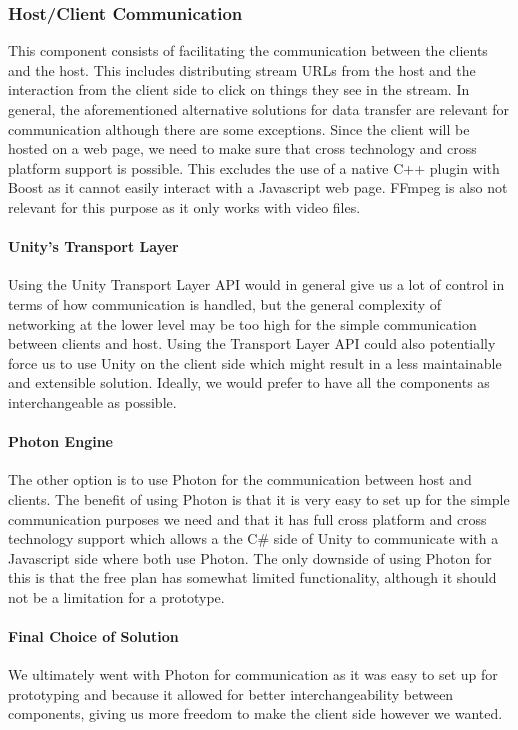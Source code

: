 \subsubsection{Host/Client Communication} %
This component consists of facilitating the communication between the clients and the host. This includes distributing stream URLs from the host and the interaction from the client side to click on things they see in the stream. In general, the aforementioned alternative solutions for data transfer are relevant for communication although there are some exceptions. Since the client will be hosted on a web page, we need to make sure that cross technology and cross platform support is possible. This excludes the use of a native C++ plugin with Boost as it cannot easily interact with a Javascript web page. FFmpeg is also not relevant for this purpose as it only works with video files.  
    
\paragraph{Unity's Transport Layer}
Using the Unity Transport Layer API would in general give us a lot of control in terms of how communication is handled, but the general complexity of networking at the lower level may be too high for the simple communication between clients and host. Using the Transport Layer API could also potentially force us to use Unity on the client side which might result in a less maintainable and extensible solution. Ideally, we would prefer to have all the components as interchangeable as possible. 
      
\paragraph{Photon Engine}
The other option is to use Photon for the communication between host and clients. The benefit of using Photon is that it is very easy to set up for the simple communication purposes we need and that it has full cross platform and cross technology support which allows a the C\# side of Unity to communicate with a Javascript side where both use Photon. The only downside of using Photon for this is that the free plan has somewhat limited functionality, although it should not be a limitation for a prototype. 

\paragraph{Final Choice of Solution}
We ultimately went with Photon for communication as it was easy to set up for prototyping and because it allowed for better interchangeability between components, giving us more freedom to make the client side however we wanted. 
    
